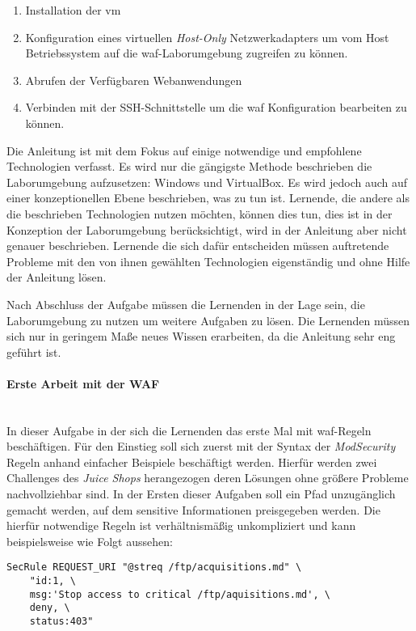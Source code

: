 \begin{enumerate}
    \item Installation der \ac{vm}
    \item Konfiguration eines virtuellen \textit{Host-Only} Netzwerkadapters um vom Host Betriebssystem auf die \ac{waf}-Laborumgebung zugreifen zu können.
    \item Abrufen der Verfügbaren Webanwendungen
    \item Verbinden mit der SSH-Schnittstelle um die \ac{waf} Konfiguration bearbeiten zu können.
\end{enumerate}

Die Anleitung ist mit dem Fokus auf einige notwendige und empfohlene Technologien verfasst.
Es wird nur die gängigste Methode beschrieben die Laborumgebung aufzusetzen: Windows und VirtualBox.
Es wird jedoch auch auf einer konzeptionellen Ebene beschrieben, was zu tun ist.
Lernende, die andere als die beschrieben Technologien nutzen möchten, können dies tun, dies ist in der Konzeption der Laborumgebung berücksichtigt, wird in der Anleitung aber nicht genauer beschrieben.
Lernende die sich dafür entscheiden müssen auftretende Probleme mit den von ihnen gewählten Technologien eigenständig und ohne Hilfe der Anleitung lösen.

Nach Abschluss der Aufgabe müssen die Lernenden in der Lage sein, die Laborumgebung zu nutzen um weitere Aufgaben zu lösen.
Die Lernenden müssen sich nur in geringem Maße neues Wissen erarbeiten, da die Anleitung sehr eng geführt ist.

\paragraph{Erste Arbeit mit der WAF}\ \\

In dieser Aufgabe in der sich die Lernenden das erste Mal mit \ac{waf}-Regeln beschäftigen.
Für den Einstieg soll sich zuerst mit der Syntax der \textit{ModSecurity} Regeln anhand einfacher Beispiele beschäftigt werden.
Hierfür werden zwei Challenges des \textit{Juice Shops} herangezogen deren Lösungen ohne größere Probleme nachvollziehbar sind.
In der Ersten dieser Aufgaben soll ein Pfad unzugänglich gemacht werden, auf dem sensitive Informationen preisgegeben werden.
Die hierfür notwendige Regeln ist verhältnismäßig unkompliziert und kann beispielsweise wie Folgt aussehen:\\

\begin{lstlisting}
SecRule REQUEST_URI "@streq /ftp/acquisitions.md" \
    "id:1, \
    msg:'Stop access to critical /ftp/aquisitions.md', \
    deny, \
    status:403"
\end{lstlisting}\ \\

